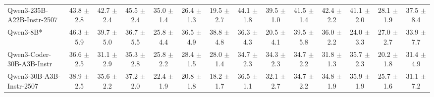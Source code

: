 \documentclass{llmxive}
\begin{document}
\begin{table}[t]
{\begin{tabular}{l *{13}{c}}

Qwen3-235B-A22B-Instr-2507 
 & 43.8 {\tiny$\pm$ 2.8} 
 & 42.7 {\tiny$\pm$ 2.4} & 
 45.5 {\tiny$\pm$ 2.4} & 
 35.0 {\tiny$\pm$ 1.4} & 
 26.4 {\tiny$\pm$ 1.3} & 
 19.5 {\tiny$\pm$ 2.7} & 
 44.1 {\tiny$\pm$ 1.8} & 
 39.5 {\tiny$\pm$ 1.0} & 
 41.5 {\tiny$\pm$ 1.4} & 
 42.4 {\tiny$\pm$ 2.2} & 
 41.1 {\tiny$\pm$ 2.0} & 
 28.1 {\tiny$\pm$ 1.9} & 
 37.5 {\tiny$\pm$ 8.4} \\

\rowcolor{gray!10}
 Qwen3-8B* &
46.3 {\tiny$\pm$ 5.9} & 
39.7 {\tiny$\pm$ 5.0} & 
36.7 {\tiny$\pm$ 5.5} & 
25.8 {\tiny$\pm$ 4.4} &
36.5 {\tiny$\pm$ 4.9} & 
38.8 {\tiny$\pm$ 4.8} & 
36.3 {\tiny$\pm$ 4.3} & 
20.5 {\tiny$\pm$ 4.1} &
39.5 {\tiny$\pm$ 5.8} & 
36.0 {\tiny$\pm$ 2.2} & 
24.0 {\tiny$\pm$ 3.3} & 
27.0 {\tiny$\pm$ 2.7} &
33.9 {\tiny$\pm$ 7.7} \\


Qwen3-Coder-30B-A3B-Instr
 & 36.6 {\tiny$\pm$ 2.5} & 
 31.1 {\tiny$\pm$ 2.9} & 
 35.3 {\tiny$\pm$ 2.8} & 
 25.8 {\tiny$\pm$ 2.2} & 
 28.4 {\tiny$\pm$ 1.5} & 
 28.0 {\tiny$\pm$ 1.4} & 
 34.7 {\tiny$\pm$ 2.3} & 
 34.3 {\tiny$\pm$ 2.3} & 
 34.7 {\tiny$\pm$ 2.2} & 
 31.8 {\tiny$\pm$ 1.3} & 
 35.7 {\tiny$\pm$ 2.3} & 
 20.2 {\tiny$\pm$ 1.8} & 
 31.4 {\tiny$\pm$ 4.9} \\

\rowcolor{gray!10}
Qwen3-30B-A3B-Instr-2507
 & 38.9 {\tiny$\pm$ 2.5} & 
 35.6 {\tiny$\pm$ 2.2} & 
 37.2 {\tiny$\pm$ 2.0} & 
 22.4 {\tiny$\pm$ 1.9} & 
 20.8 {\tiny$\pm$ 1.8} & 
 18.2 {\tiny$\pm$ 1.7} & 
 36.5 {\tiny$\pm$ 1.1} & 
 32.1 {\tiny$\pm$ 2.7} & 
 34.7 {\tiny$\pm$ 2.2} & 
 34.8 {\tiny$\pm$ 1.9} & 
 35.9 {\tiny$\pm$ 1.9} & 
 25.7 {\tiny$\pm$ 1.6} & 
 31.1 {\tiny$\pm$ 7.2} \\



\end{tabular}}
\end{table}
\end{document}
